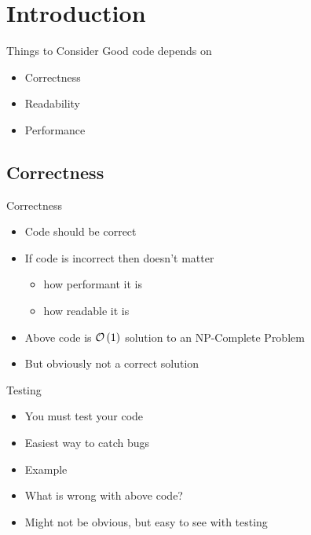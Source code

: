 \section{Introduction}
\begin{frame}{Things to Consider}
    Good code depends on
    \pause
    \begin{itemize}[<+->]
        \item Correctness
        \item Readability
        \item Performance
    \end{itemize}
\end{frame}
\subsection{Correctness}
\begin{frame}{Correctness}
    \pause
    \begin{itemize}[<+->]
        \item Code should be correct
        \item If code is incorrect then doesn't matter
              \begin{itemize}[<+->]
                  \item how performant it is
                  \item how readable it is
              \end{itemize}
    \end{itemize}
    \pause
    \pause
    \begin{itemize}[<+->]
        \item Above code is $\mathcal{O}\left(1\right)$ solution to an NP-Complete Problem
        \item But obviously not a correct solution
    \end{itemize}
\end{frame}
\begin{frame}{Testing}
    \pause
    \begin{itemize}[<+->]
        \item You must test your code
        \item Easiest way to catch bugs
        \item Example
    \end{itemize}
    \pause
    \pause
    \begin{itemize}[<+->]
        \item What is wrong with above code?
        \item Might not be obvious, but easy to see with testing
    \end{itemize}
\end{frame}

